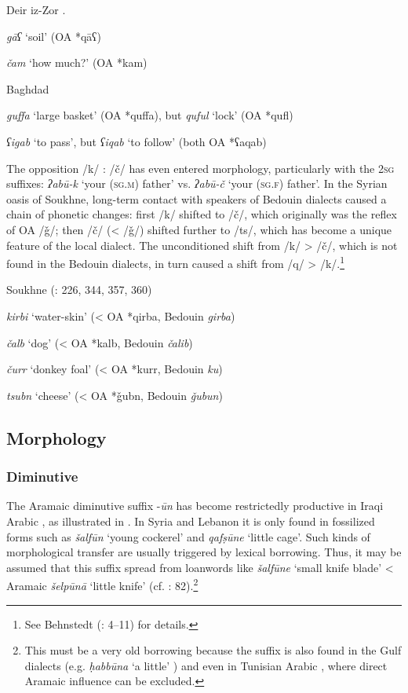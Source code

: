 \documentclass[output=paper]{langsci/langscibook}
\begin{document}
\ea\label{Deir}Deir iz-Zor \citep[42--43]{Jastrow1978}. 

\textit{gāʕ} ‘soil’ (OA *qāʕ)

\textit{čam} ‘how much?’ (OA *kam)
\z

\ea\label{Baghdad}Baghdad \citep[18--19]{Palva2009}

\textit{guffa} ‘large basket’ (OA *quffa), but \textit{quful} ‘lock’ (OA *qufl)

\textit{ʕigab} ‘to pass’, but \textit{ʕiqab} ‘to follow’ (both OA *ʕaqab)
\z

The opposition /k/ : /č/ has even entered morphology, particularly with the 2\textsc{sg} suffixes: \textit{ʔabū-k} `your (\textsc{sg.m}) father' vs. \textit{ʔabū-č} ‘your (\textsc{sg.f}) father’. In the Syrian oasis of Soukhne, long-term contact with speakers of Bedouin dialects caused a chain of phonetic changes: first /k/ shifted to /č/, which originally was the reflex of OA /ǧ/; then /č/ (< /ǧ/) shifted further to /ts/, which has become a unique feature of the local dialect. The unconditioned shift from /k/ > /č/, which is not found in the Bedouin dialects, in turn caused a shift from /q/ > /k/.\footnote{See Behnstedt (\citeyear{Behnstedt1994Soukhne}: 4--11) for details.}

\ea
Soukhne (\citealt{Behnstedt1994Soukhne}: 226, 344, 357, 360)

\textit{kirbi} ‘water-skin’ (< OA *qirba, Bedouin \textit{girba})

\textit{čalb} ‘dog’ (< OA *kalb, Bedouin \textit{čalib})

\textit{čurr} ‘donkey foal’ (< OA *kurr, Bedouin \textit{ku\R\R})

\textit{tsubn} ‘cheese’ (< OA *ǧubn, Bedouin \textit{ǧubun})
\z

\subsection{Morphology}
\subsubsection{Diminutive}
The Aramaic diminutive suffix -\textit{ūn} has become restrictedly productive in Iraqi Arabic \citep[72]{Masliyah1997}, as illustrated in . In Syria and Lebanon it is only found in fossilized forms such as \textit{šalfūn} ‘young cockerel’ and \textit{qafṣūne} ‘little cage’.  Such kinds of morphological transfer are usually triggered by lexical borrowing. Thus, it may be assumed that this suffix spread from loanwords like \textit{šalfūne} ‘small knife blade’ < Aramaic \textit{šelpūnā} ‘little knife’ (cf. \citealt{Féghali1918}: 82).\footnote{This must be a very old borrowing because the suffix is also found in the Gulf dialects (e.g. \textit{ḥabbūna} ‘a little’ \citealt[279]{Holes2002}) and even in Tunisian Arabic \citep[496]{Singer1984}, where direct Aramaic influence can be excluded.}
\end{document}
